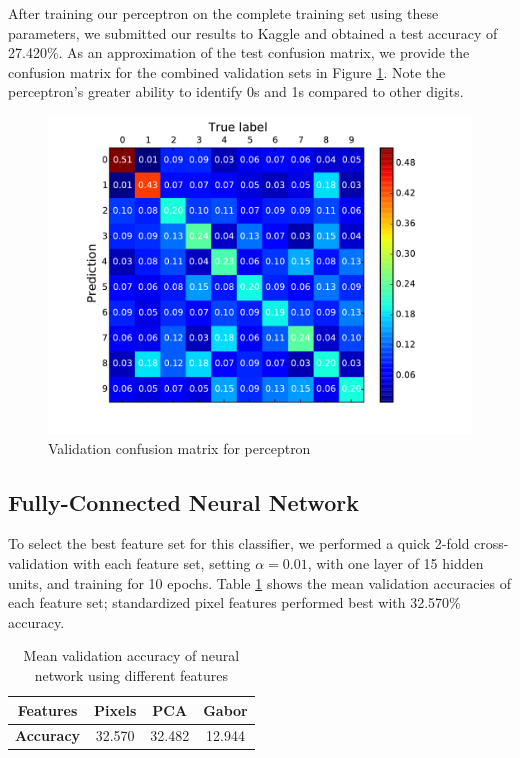 \documentclass{acm_proc_article-sp}
\begin{document}
After training our perceptron on the complete training set using these parameters, we submitted our results to Kaggle and obtained a test accuracy of 27.420\%. As an approximation of the test confusion matrix, we provide the confusion matrix for the combined validation sets in Figure \ref{fig:perc-confusion}. Note the perceptron's greater ability to identify 0s and 1s compared to other digits.
\begin{figure}[h!]
	\centering
	\includegraphics[width=\linewidth]{perceptron_confusion}
  	\caption{Validation confusion matrix for perceptron}
  	\label{fig:perc-confusion}
\end{figure}

\subsection{Fully-Connected Neural Network}
To select the best feature set for this classifier, we performed a quick 2-fold cross-validation with each feature set, setting $\alpha = 0.01$, with one layer of 15 hidden units, and training for 10 epochs. Table \ref{tab:nn-features} shows the mean validation accuracies of each feature set; standardized pixel features performed best with 32.570\% accuracy.

\begin{table}[h!]
  \centering
  \begin{tabular}{|c||c|c|c| }
    \hline
    {\bfseries Features} & Pixels & PCA & Gabor \\
    \hline
    {\bfseries Accuracy} & 32.570 & 32.482 & 12.944 \\
    \hline
  \end{tabular}
  \caption{Mean validation accuracy of neural network using different features}
  \label{tab:nn-features}
\end{table}
\end{document}

